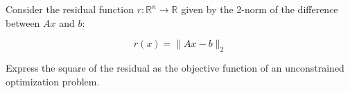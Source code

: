 Consider the residual function $r: \mathbb{R}^n \to \mathbb{R}$ given by the 2-norm of the difference between $Ax$ and 
$b$:

$$
r(x) = \lVert Ax - b \rVert_2
$$

Express the square of the residual as the objective function of an unconstrained optimization problem.

\begin{solution}
  \ \\
  \vfill
\end{solution}